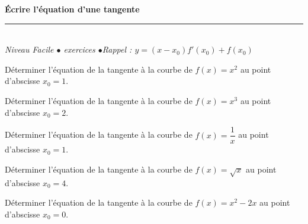 \documentclass[11pt,a4paper]{article}
\begin{document}
\begin{center}
{\LARGE\bfseries\color{primarydark} Écrire l'équation d'une tangente}\\[2pt]
{\color{primary}\rule{0.5\textwidth}{1.2pt}}\\[4pt]
{\small\itshape Niveau Facile \quad$\bullet$ exercices \quad$\bullet$\quad Rappel : $y=(x-x_0)f'(x_0)+f(x_0)$}
\end{center}
\vspace{2mm}

\begin{exo}[1]
Déterminer l'équation de la tangente à la courbe de $f(x)=x^2$ au point d'abscisse $x_0=1$.
\end{exo}

\begin{exo}[2]
Déterminer l'équation de la tangente à la courbe de $f(x)=x^3$ au point d'abscisse $x_0=2$.
\end{exo}

\begin{exo}[3]
Déterminer l'équation de la tangente à la courbe de $f(x)=\dfrac{1}{x}$ au point d'abscisse $x_0=1$.
\end{exo}

\begin{exo}[4]
Déterminer l'équation de la tangente à la courbe de $f(x)=\sqrt{x}$ au point d'abscisse $x_0=4$.
\end{exo}

\begin{exo}[5]
Déterminer l'équation de la tangente à la courbe de $f(x)=x^2-2x$ au point d'abscisse $x_0=0$.
\end{exo}
\end{document}
